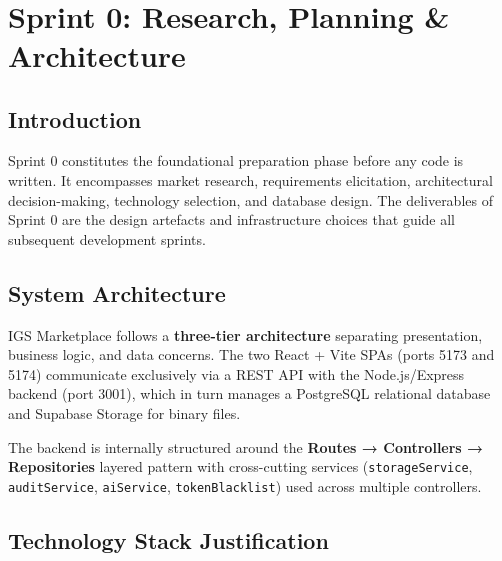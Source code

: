 ﻿﻿%
\chapter{Sprint 0: Research, Planning \& Architecture}
\chaptersommaire
\clearpage

\section*{Introduction}
Sprint 0 constitutes the foundational preparation phase before any code is written. It encompasses market research, requirements elicitation, architectural decision-making, technology selection, and database design. The deliverables of Sprint 0 are the design artefacts and infrastructure choices that guide all subsequent development sprints.

\section{System Architecture}

IGS Marketplace follows a \textbf{three-tier architecture} separating presentation, business logic, and data concerns. The two React + Vite SPAs (ports 5173 and 5174) communicate exclusively via a REST API with the Node.js/Express backend (port 3001), which in turn manages a PostgreSQL relational database and Supabase Storage for binary files.

The backend is internally structured around the \textbf{Routes → Controllers → Repositories} layered pattern with cross-cutting services (\texttt{storageService}, \texttt{auditService}, \texttt{aiService}, \texttt{tokenBlacklist}) used across multiple controllers.

\section{Technology Stack Justification}

